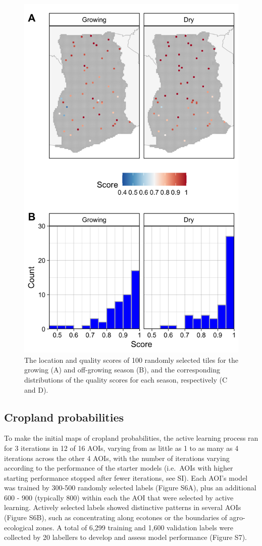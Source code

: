 \documentclass[11pt,a4paper]{article}
\begin{document}
\begin{figure}

{\centering \includegraphics[width=0.7\linewidth]{figures/figure3} 

}

\caption{The location and quality scores of 100 randomly selected tiles for the growing (A) and off-growing season (B), and the corresponding distributions of the quality scores for each season, respectively (C and D).}\label{fig:imqual}
\end{figure}

\hypertarget{cropland-probabilities}{%
\subsection{Cropland probabilities}\label{cropland-probabilities}}

To make the initial maps of cropland probabilities, the active learning
process ran for 3 iterations in 12 of 16 AOIs, varying from as little as
1 to as many as 4 iterations across the other 4 AOIs, with the number of
iterations varying according to the performance of the starter models
(i.e.~AOIs with higher starting performance stopped after fewer
iterations, see SI). Each AOI's model was trained by 300-500 randomly
selected labels (Figure S6A), plus an additional 600 - 900 (typically
800) within each the AOI that were selected by active learning. Actively
selected labels showed distinctive patterns in several AOIs (Figure
S6B), such as concentrating along ecotones or the boundaries of
agro-ecological zones. A total of 6,299 training and 1,600 validation
labels were collected by 20 labellers to develop and assess model
performance (Figure S7).
\end{document}
